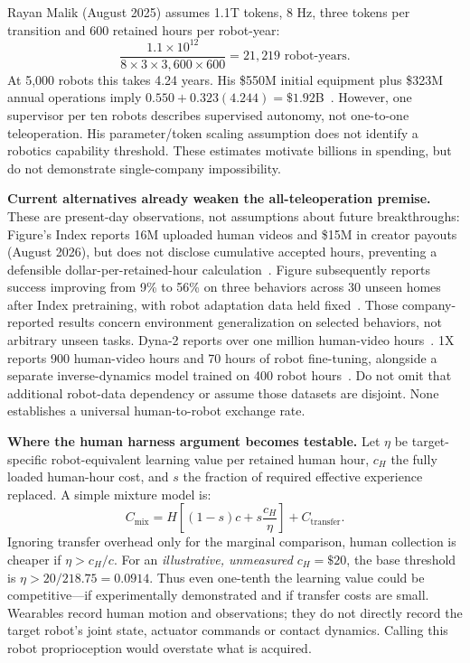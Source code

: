 \documentclass{article}
\begin{document}
Rayan Malik (August 2025) assumes 1.1T tokens, 8 Hz, three tokens per
transition and 600 retained hours per robot-year:
\[
\frac{1.1\times10^{12}}{8\times3\times3{,}600\times600}
=21{,}219\text{ robot-years}.
\]
At 5,000 robots this takes 4.24 years. His \$550M initial equipment plus
\$323M annual operations imply $0.550+0.323(4.244)=\$1.92$B~\cite{malik}.
However, one supervisor per ten robots describes supervised autonomy,
not one-to-one teleoperation. His parameter/token scaling assumption does
not identify a robotics capability threshold. These estimates motivate
billions in spending, but do not demonstrate single-company impossibility.

\textbf{Current alternatives already weaken the all-teleoperation premise.}
These are present-day observations, not assumptions about future breakthroughs:
Figure's Index reports 16M uploaded human videos and \$15M in creator payouts
(August 2026), but does not disclose cumulative accepted hours, preventing
a defensible dollar-per-retained-hour calculation~\cite{index}.
Figure subsequently reports success improving from 9\% to 56\% on three
behaviors across 30 unseen homes after Index pretraining, with robot
adaptation data held fixed~\cite{helix}. Those company-reported results concern
environment generalization on selected behaviors, not arbitrary unseen tasks.
Dyna-2 reports over one million human-video hours~\cite{dyna}.
1X reports 900 human-video hours and 70 hours of robot fine-tuning, alongside
a separate inverse-dynamics model trained on 400 robot hours~\cite{onex}.
Do not omit that additional robot-data dependency or assume those datasets
are disjoint. None establishes a universal human-to-robot exchange rate.

\textbf{Where the human harness argument becomes testable.}
Let $\eta$ be target-specific robot-equivalent learning value per retained
human hour, $c_H$ the fully loaded human-hour cost, and $s$ the fraction of
required effective experience replaced. A simple mixture model is:
\[
C_{\mathrm{mix}}=H\left[(1-s)c+s\frac{c_H}{\eta}\right]+C_{\mathrm{transfer}}.
\]
Ignoring transfer overhead only for the marginal comparison, human collection
is cheaper if $\eta>c_H/c$. For an \emph{illustrative, unmeasured}
$c_H=\$20$, the base threshold is $\eta>20/218.75=0.0914$.
Thus even one-tenth the learning value could be competitive---if experimentally
demonstrated and if transfer costs are small. Wearables record human motion
and observations; they do not directly record the target robot's joint state,
actuator commands or contact dynamics. Calling this robot proprioception
would overstate what is acquired.
\end{document}
